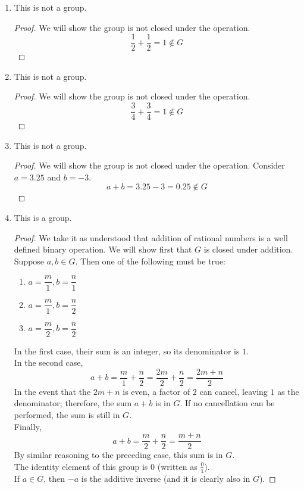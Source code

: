 \begin{enumerate}
\begin{sln}
\begin{enumerate}
				\item This is not a group.
					\begin{proof}
						We will show the group is not closed under the operation.
						\[\frac{1}{2} + \frac{1}{2} = 1\notin G\]
					\end{proof}
				
				\item This is not a group.
					\begin{proof}
						We will show the group is not closed under the operation.
						\[\frac{3}{4} + \frac{3}{4} = 1\notin G\]
					\end{proof}
				
				\item This is not a group.
					\begin{proof}
						We will show the group is not closed under the operation.  Consider $a=3.25$ and $b=-3$.
						\[a+b = 3.25 - 3 = 0.25\notin G\]
					\end{proof}
				\item This is a group.
					\begin{proof}
						We take it as understood that addition of rational numbers is a well defined binary operation.  We will show first that $G$ is closed under addition.\\
						Suppose $a,b\in G$.  Then one of the following must be true:
						\begin{enumerate}
							\item $a = \dfrac{m}{1}, b = \dfrac{n}{1}$
							\item $a = \dfrac{m}{1}, b = \dfrac{n}{2}$
							\item $a = \dfrac{m}{2}, b = \dfrac{n}{2}$
						\end{enumerate}
						In the first case, their sum is an integer, so its denominator is $1$.  \\In the second case, \[a+b = \dfrac{m}{1} +\dfrac{n}{2} = \dfrac{2m}{2} +\dfrac{n}{2} = \dfrac{2m+n}{2}\]
						In the event that the $2m+n$ is even, a factor of $2$ can cancel, leaving $1$ as the denominator; therefore, the sum $a+b$ is in $G$.  If no cancellation can be performed, the sum is still in $G$.\\
						Finally, \[a+b = \dfrac{m}{2}+\dfrac{n}{2} = \dfrac{m+n}{2}\]  By similar reasoning to the preceding case, this sum is in $G$.\\
						The identity element of this group is $0$ (written as $\frac{0}{1}$).\\
						If $a\in G$, then $-a$ is the additive inverse (and it is clearly also in $G$).

\end{proof}
\end{enumerate}
\end{sln}
\end{enumerate}
